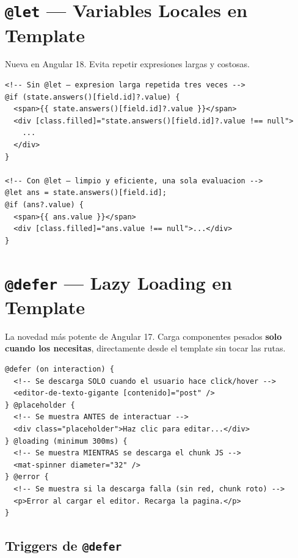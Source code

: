 \documentclass[12pt, a4paper]{article}
\begin{document}
\section{ \texttt{@let} --- Variables Locales en Template}

Nueva en Angular 18. Evita repetir expresiones largas y costosas.

\begin{lstlisting}
<!-- Sin @let — expresion larga repetida tres veces -->
@if (state.answers()[field.id]?.value) {
  <span>{{ state.answers()[field.id]?.value }}</span>
  <div [class.filled]="state.answers()[field.id]?.value !== null">
    ...
  </div>
}

<!-- Con @let — limpio y eficiente, una sola evaluacion -->
@let ans = state.answers()[field.id];
@if (ans?.value) {
  <span>{{ ans.value }}</span>
  <div [class.filled]="ans.value !== null">...</div>
}
\end{lstlisting}

\section{ \texttt{@defer} --- Lazy Loading en Template}

La novedad más potente de Angular 17. Carga componentes pesados
\textbf{solo cuando los necesitas}, directamente desde el template
sin tocar las rutas.

\begin{lstlisting}
@defer (on interaction) {
  <!-- Se descarga SOLO cuando el usuario hace click/hover -->
  <editor-de-texto-gigante [contenido]="post" />
} @placeholder {
  <!-- Se muestra ANTES de interactuar -->
  <div class="placeholder">Haz clic para editar...</div>
} @loading (minimum 300ms) {
  <!-- Se muestra MIENTRAS se descarga el chunk JS -->
  <mat-spinner diameter="32" />
} @error {
  <!-- Se muestra si la descarga falla (sin red, chunk roto) -->
  <p>Error al cargar el editor. Recarga la pagina.</p>
}
\end{lstlisting}

\subsection{Triggers de \texttt{@defer}}
\end{document}
